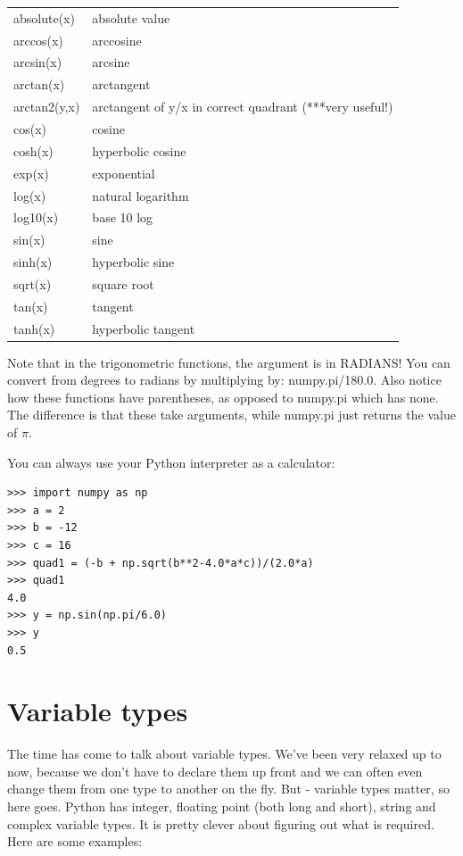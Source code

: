 \documentclass[11pt]{book}
\begin{document}
{{{\begin{tabular}{ll}
\hline
absolute(x)  \qquad & absolute value\\
arccos(x)    \qquad & arccosine\\
arcsin(x)    \qquad & arcsine\\
arctan(x)    \qquad & arctangent\\
arctan2(y,x)  \qquad &arctangent of y/x in correct quadrant (***very useful!)\\
cos(x)        \qquad &cosine\\
cosh(x)      \qquad & hyperbolic cosine\\
exp(x)      \qquad &  exponential\\
log(x)      \qquad &  natural logarithm\\
log10(x)    \qquad &  base 10 log\\
sin(x)       \qquad & sine\\
sinh(x)     \qquad &  hyperbolic sine\\
sqrt(x)    \qquad &   square root\\
tan(x)      \qquad &  tangent\\
tanh(x)    \qquad &   hyperbolic tangent\\
\hline
\end{tabular}

\noindent
Note that in the trigonometric functions,  the argument is in RADIANS! You can convert from degrees to radians by multiplying by:  {\color{blue}numpy.pi/180.0}.  Also notice how these functions have parentheses, as opposed to {\color{blue}numpy.pi} which has none.  The difference is that these take arguments, while {\color{blue}numpy.pi} just returns the value of $\pi$.


\noindent
You can always use your Python interpreter as a calculator:

{ \color{blue} \begin{verbatim}
>>> import numpy as np
>>> a = 2
>>> b = -12
>>> c = 16
>>> quad1 = (-b + np.sqrt(b**2-4.0*a*c))/(2.0*a)
>>> quad1
4.0
>>> y = np.sin(np.pi/6.0)
>>> y
0.5
\end{verbatim}}


\section{Variable types}

The time has come to talk about variable types.  We've been very relaxed up to now, because we don't have to declare them up front and we can often even change them from one type to another on the fly.  But - variable types matter, so here goes. Python has integer, floating point (both long and short), string and complex variable types.  It is pretty clever about figuring out what is required.   Here are some examples:

}}}
\end{document}
